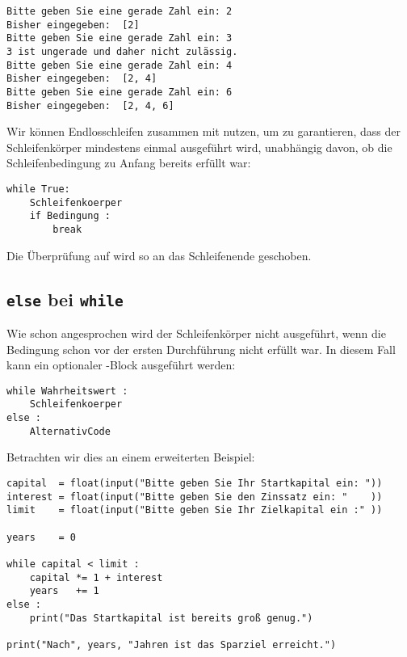 \begin{cmdbox}
\begin{verbatim}
Bitte geben Sie eine gerade Zahl ein: 2
Bisher eingegeben:  [2]
Bitte geben Sie eine gerade Zahl ein: 3
3 ist ungerade und daher nicht zulässig.
Bitte geben Sie eine gerade Zahl ein: 4
Bisher eingegeben:  [2, 4]
Bitte geben Sie eine gerade Zahl ein: 6
Bisher eingegeben:  [2, 4, 6]
\end{verbatim}
\end{cmdbox}

\begin{hintbox}
Wir können Endlosschleifen zusammen mit  nutzen, um zu garantieren, dass der Schleifenkörper mindestens einmal ausgeführt wird, unabhängig davon, ob die Schleifenbedingung zu Anfang bereits erfüllt war:
\begin{codebox}
\begin{verbatim}
while True:
    Schleifenkoerper
    if Bedingung :
        break
\end{verbatim}
\end{codebox}
Die Überprüfung auf  wird so an das Schleifenende geschoben.
\end{hintbox}


\subsection{\texttt{else} bei \texttt{while}}
Wie schon angesprochen wird der Schleifenkörper nicht ausgeführt, wenn die Bedingung schon vor der ersten Durchführung nicht erfüllt war. In diesem Fall kann ein optionaler -Block ausgeführt werden:

\begin{codebox}
\begin{verbatim}
while Wahrheitswert :
    Schleifenkoerper
else :
    AlternativCode
\end{verbatim}
\end{codebox}

Betrachten wir dies an einem erweiterten Beispiel:
\begin{codebox}
\begin{verbatim}
capital  = float(input("Bitte geben Sie Ihr Startkapital ein: "))
interest = float(input("Bitte geben Sie den Zinssatz ein: "    ))
limit    = float(input("Bitte geben Sie Ihr Zielkapital ein :" ))

years    = 0

while capital < limit :
    capital *= 1 + interest
    years   += 1
else :
    print("Das Startkapital ist bereits groß genug.")
  
print("Nach", years, "Jahren ist das Sparziel erreicht.")
\end{verbatim}
\end{codebox}

